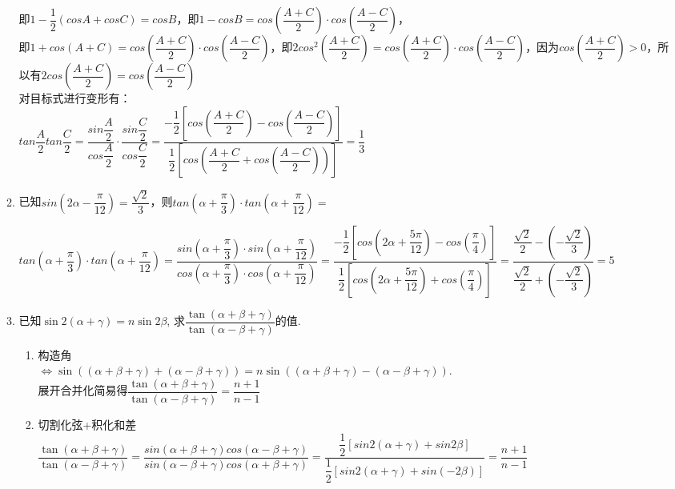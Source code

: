 \begin{enumerate}
\begin{enumerate}
\begin{jieda}
            即$1 - \dfrac{1}{2}(cosA + cosC) = cosB$，即$1 - cosB = cos(\dfrac{A+C}{2}) \cdot cos(\dfrac{A-C}{2})$，\\
            即$1 + cos(A+C) = cos(\dfrac{A+C}{2}) \cdot cos(\dfrac{A-C}{2})$，即$2cos^2(\dfrac{A+C}{2}) = cos(\dfrac{A+C}{2}) \cdot cos(\dfrac{A-C}{2})$，因为$cos(\dfrac{A+C}{2}) > 0$，所以有$2cos(\dfrac{A+C}{2}) = cos(\dfrac{A-C}{2})$ \\
            对目标式进行变形有：\\
            $tan\dfrac{A}{2}tan\dfrac{C}{2} = \dfrac{sin\dfrac{A}{2}}{cos\dfrac{A}{2}} \cdot \dfrac{sin\dfrac{C}{2}}{cos\dfrac{C}{2}} = \dfrac{-\dfrac{1}{2}[cos(\dfrac{A+C}{2}) - cos(\dfrac{A-C}{2})]}{\dfrac{1}{2}[cos(\dfrac{A+C}{2} + cos(\dfrac{A-C}{2}))]} = \dfrac{1}{3}$
        \end{jieda}
        \item 已知$sin(2\alpha-\dfrac{\pi}{12}) = \dfrac{\sqrt{2}}{3}$，则$tan(\alpha+\dfrac{\pi}{3}) \cdot tan(\alpha + \dfrac{\pi}{12}) = $
        \begin{jieda}
            $tan(\alpha+\dfrac{\pi}{3}) \cdot tan(\alpha + \dfrac{\pi}{12}) = \dfrac{sin(\alpha+\dfrac{\pi}{3}) \cdot sin(\alpha + \dfrac{\pi}{12})}{cos(\alpha+\dfrac{\pi}{3}) \cdot cos(\alpha + \dfrac{\pi}{12})} = \dfrac{-\dfrac{1}{2}\left[cos(2\alpha+\dfrac{5\pi}{12}) - cos(\dfrac{\pi}{4})\right]}{\dfrac{1}{2}\left[cos(2\alpha+\dfrac{5\pi}{12}) + cos(\dfrac{\pi}{4})\right]} = \dfrac{\dfrac{\sqrt{2}}{2} - (-\dfrac{\sqrt{2}}{3})}{\dfrac{\sqrt{2}}{2}+(-\dfrac{\sqrt{2}}{3})} = 5$
        \end{jieda}
        \item 已知$\sin2\left(\alpha+\gamma\right)=n\sin2\beta$, 求$\dfrac{\tan\left(\alpha+\beta+\gamma\right)}{\tan\left(\alpha-\beta+\gamma\right)}$的值. 
        \begin{jieda}
        \begin{enumerate}
            \item 构造角 \\
            $\iff\sin\left(\left(\alpha+\beta+\gamma\right)+\left(\alpha-\beta+\gamma\right)\right)=n\sin\left(\left(\alpha+\beta+\gamma\right)-\left(\alpha-\beta+\gamma\right)\right)$. \\
            展开合并化简易得$\dfrac{\tan\left(\alpha+\beta+\gamma\right)}{\tan\left(\alpha-\beta+\gamma\right)}=\dfrac{n+1}{n-1}$
            \item 切割化弦+积化和差\\ 
            $\dfrac{\tan\left(\alpha+\beta+\gamma\right)}{\tan\left(\alpha-\beta+\gamma\right)} = \dfrac{sin(\alpha+\beta+\gamma)cos(\alpha-\beta+\gamma)}{sin(\alpha-\beta+\gamma)cos(\alpha+\beta+\gamma)} = \dfrac{\dfrac{1}{2}\left[sin2(\alpha+\gamma) + sin2\beta\right]}{\dfrac{1}{2}\left[sin2(\alpha+\gamma) + sin(-2\beta)\right]} = \dfrac{n+1}{n-1}$

\end{enumerate}
\end{jieda}
\end{enumerate}
\end{enumerate}
